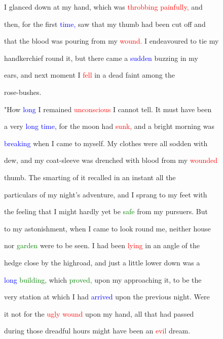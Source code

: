  I glanced down at my hand, which was \textcolor{red}{throbbing} \textcolor{red}{painfully,} and

 then, for the first \textcolor{blue}{time,} saw that my thumb had been cut off and

 that the blood was pouring from my \textcolor{red}{wound.} I endeavoured to tie my

 handkerchief round it, but there came a \textcolor{blue}{sudden} buzzing in my

 ears, and next moment I \textcolor{red}{fell} in a dead faint among the

 rose-bushes.



 "How \textcolor{blue}{long} I remained \textcolor{red}{unconscious} I cannot tell. It must have been

 a very \textcolor{blue}{long} \textcolor{blue}{time,} for the moon had \textcolor{red}{sunk,} and a bright morning was

 \textcolor{blue}{breaking} when I came to myself. My clothes were all sodden with

 dew, and my coat-sleeve was drenched with blood from my \textcolor{red}{wounded}

 thumb. The smarting of it recalled in an instant all the

 particulars of my night's \textcolor{BurntOrange}{adventure,} and I sprang to my feet with

 the feeling that I might hardly yet be \textcolor{green}{safe} from my pursuers. But

 to my \textcolor{BurntOrange}{astonishment,} when I came to look round me, neither house

 nor \textcolor{green}{garden} were to be seen. I had been \textcolor{red}{lying} in an angle of the

 hedge close by the highroad, and just a little lower down was a

 \textcolor{blue}{long} \textcolor{green}{building,} which \textcolor{green}{proved,} upon my approaching it, to be the

 very station at which I had \textcolor{blue}{arrived} upon the previous night. Were

 it not for the \textcolor{red}{ugly} \textcolor{red}{wound} upon my hand, all that had passed

 during those \textcolor{BurntOrange}{dreadful} hours might have been an \textcolor{red}{evil} dream.



